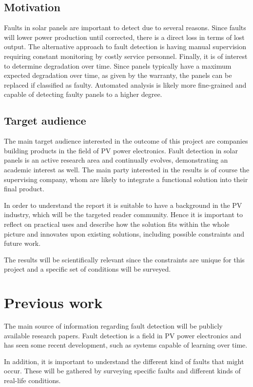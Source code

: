 \documentclass[a4paper,11pt]{article}
\begin{document}
\subsection*{Motivation}
Faults in solar panels are important to detect due to several reasons.
Since faults will lower power production until corrected, there is a direct loss in terms of lost output.
The alternative approach to fault detection is having manual supervision requiring constant monitoring by costly service personnel.
Finally, it is of interest to determine degradation over time.
Since panels typically have a maximum expected degradation over time, as given by the warranty, the panels can be replaced if classified as faulty.
Automated analysis is likely more fine-grained and capable of detecting faulty panels to a higher degree.

\subsection*{Target audience}
The main target audience interested in the outcome of this project are companies building products in the field of PV power electronics.
Fault detection in solar panels is an active research area and continually evolves, demonstrating an academic interest as well.
The main party interested in the results is of course the supervising company, whom are likely to
integrate a functional solution into their final product.

In order to understand the report it is suitable to have a background in the PV industry, which will be the targeted reader community.
Hence it is important to reflect on practical uses and describe how the solution fits within the whole picture and innovates upon existing solutions, including possible constraints and future work.

The results will be scientifically relevant since the constraints are unique for this project and a specific set of conditions will be surveyed.

\section*{Previous work}
The main source of information regarding fault detection will be publicly available research papers.
Fault detection is a field in PV power electronics and has seen some recent development, such as systems capable of learning over time.

In addition, it is important to understand the different kind of faults that might occur.
These will be gathered by surveying specific faults and different kinds of real-life conditions.
\end{document}
